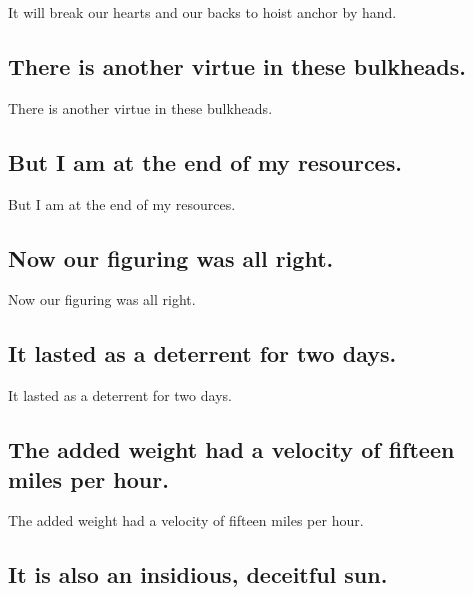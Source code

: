 \documentclass[]{article}
\begin{document}
It will break our hearts and our backs to hoist anchor by hand.

\hypertarget{there-is-another-virtue-in-these-bulkheads.}{%
\subsection{There is another virtue in these
bulkheads.}\label{there-is-another-virtue-in-these-bulkheads.}}

There is another virtue in these bulkheads.

\hypertarget{but-i-am-at-the-end-of-my-resources.}{%
\subsection{But I am at the end of my
resources.}\label{but-i-am-at-the-end-of-my-resources.}}

But I am at the end of my resources.

\hypertarget{now-our-figuring-was-all-right.}{%
\subsection{Now our figuring was all
right.}\label{now-our-figuring-was-all-right.}}

Now our figuring was all right.

\hypertarget{it-lasted-as-a-deterrent-for-two-days.}{%
\subsection{It lasted as a deterrent for two
days.}\label{it-lasted-as-a-deterrent-for-two-days.}}

It lasted as a deterrent for two days.

\hypertarget{the-added-weight-had-a-velocity-of-fifteen-miles-per-hour.}{%
\subsection{The added weight had a velocity of fifteen miles per
hour.}\label{the-added-weight-had-a-velocity-of-fifteen-miles-per-hour.}}

The added weight had a velocity of fifteen miles per hour.

\hypertarget{it-is-also-an-insidious-deceitful-sun.}{%
\subsection{It is also an insidious, deceitful
sun.}\label{it-is-also-an-insidious-deceitful-sun.}}
\end{document}
